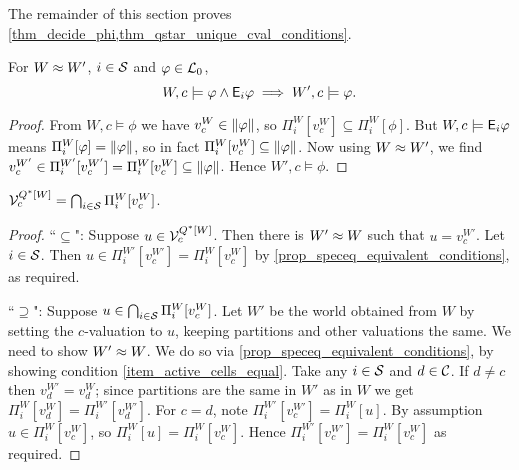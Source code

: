 The remainder of this section proves
\cref{thm_decide_phi,thm_qstar_unique_cval_conditions}.

\begin{lemma}
    \label{lemma_phi_and_ephi}
    For $W \approx W'$, $i \in \mathcal{S}$ and $\varphi \in \mathcal{L}_0$,
    \[
        W, c \models \varphi \land \mathsf{E}_i\varphi \implies W', c \models \varphi.
    \]
\end{lemma}

\begin{proof}
    From $W, c \models \phi$ we have $v^W_c \in \|{\varphi}\|$, so
    $\Pi^W_i[v^W_c] \subseteq \Pi^W_i[\phi]$. But $W, c \models \mathsf{E}_i\varphi$ means
    $\Pi^W_i[\varphi] = \|{\varphi}\|$, so in fact $\Pi^W_i[v^W_c] \subseteq
    \|{\varphi}\|$. Now using $W \approx W'$, we find $v^{W'}_c \in
    \Pi^{W'}_i[v^{W'}_c] = \Pi^W_i[v^W_c] \subseteq \|{\varphi}\|$. Hence
    $W', c \models \phi$.
\end{proof}

\begin{lemma}
    \label{lemma_vals_qstar_c}
    $\mathcal{V}^{Q^*[W]}_c = \bigcap_{i \in \mathcal{S}}{\Pi^W_i[v^W_c]}$.
\end{lemma}

\begin{proof}
    ``$\subseteq$": Suppose $u \in \mathcal{V}^{Q^*[W]}_c$. Then there is $W' \approx
    W$ such that $u = v^{W'}_c$. Let $i \in \mathcal{S}$. Then $u \in
    \Pi^{W'}_i[v^{W'}_c] = \Pi^W_i[v^W_c]$ by
    \cref{prop_speceq_equivalent_conditions}, as required.

    ``$\supseteq$": Suppose $u \in \bigcap_{i \in \mathcal{S}}{\Pi^W_i[v^W_c]}$. Let
    $W'$ be the world obtained from $W$ by setting the $c$-valuation to $u$,
    keeping partitions and other valuations the same. We need to show $W'
    \approx W$. We do so via \cref{prop_speceq_equivalent_conditions}, by
    showing condition \cref{item_active_cells_equal}. Take any $i \in
    \mathcal{S}$ and $d \in \mathcal{C}$. If $d \ne c$ then $v^{W'}_d = v^W_d$; since
    partitions are the same in $W'$ as in $W$ we get $\Pi^W_i[v^W_d] =
    \Pi^{W'}_i[v^{W'}_d]$. For $c = d$, note $\Pi^{W'}_i[v^{W'}_c] =
    \Pi^W_i[u]$. By assumption $u \in \Pi^W_i[v^W_c]$, so $\Pi^W_i[u] =
    \Pi^W_i[v^W_c]$. Hence $\Pi^{W'}_i[v^{W'}_c] = \Pi^W_i[v^W_c]$ as required.
\end{proof}

